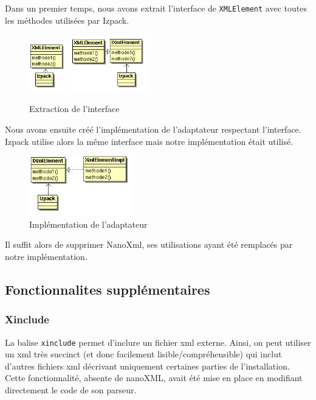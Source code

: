 Dans un premier temps, nous avons extrait l'interface de \verb|XMLElement| avec toutes les méthodes utilisées par Izpack.
\begin{figure}[H]
	\centering
	\includegraphics[width=0.15\textwidth]{../image/sol_casInitial.png}
	\hfil
	\includegraphics[width=0.3\textwidth]{../image/sol_extractionInterface.png}
	\caption{Extraction de l'interface}
\end{figure}
Nous avons ensuite créé l'implémentation de l'adaptateur respectant l'interface.
Izpack utilise alors la même interface mais notre implémentation était utilisé.
\begin{figure}[H]
	\centering
	\includegraphics[width=0.4\textwidth]{../image/sol_implementation.png}
	\caption{Implémentation de l'adaptateur}
\end{figure}
Il suffit alors de supprimer NanoXml, ses utilisations ayant été remplacés par notre implémentation.

\subsection{Fonctionnalites supplémentaires}
\subsubsection{Xinclude}
La balise \verb|xinclude| permet d'inclure un fichier xml externe.
Ainsi, on peut utiliser un xml très succinct (et donc facilement lisible/compréhensible) qui inclut d'autres fichiers xml décrivant uniquement certaines parties de l'installation. 
Cette fonctionnalité, absente de nanoXML, avait été mise en place en modifiant directement le code de son parseur.

